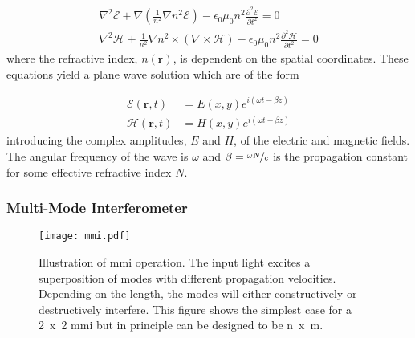 \begin{align}
	\nabla^2\mathcal{E} + \nabla\left(\frac{1}{n^2}\nabla n^2\mathcal{E}\right) - \epsilon_0\mu_0 n^2 \frac{\partial^2\mathcal{E}}{\partial t^2} = 0\\
	\nabla^2\mathcal{H} + \frac{1}{n^2}\nabla n^2\times\left(\nabla\times\mathcal{H}\right) - \epsilon_0\mu_0 n^2 \frac{\partial^2\mathcal{H}}{\partial t^2} = 0
\end{align}
where the refractive index, $n(\mathbf{r})$, is dependent on the spatial coordinates. These equations yield a plane wave solution which are of the form

\begin{align}
	\mathcal{E}(\mathbf{r}, t) &= E(x,y)e^{i(\omega t - \beta z)}\\
	\mathcal{H}(\mathbf{r}, t) &= H(x,y)e^{i(\omega t - \beta z)}
\end{align}
introducing the complex amplitudes, $E$ and $H$, of the electric and magnetic fields. The angular frequency  of the wave is $\omega$ and $\beta = \nicefrac{\omega N}{c}$ is the propagation constant for some effective refractive index $N$.






%
%
%
%
%
%

\subsubsection*{Multi-Mode Interferometer}

\begin{figure}[t]
	\centering
	\texttt{[image: mmi.pdf]}
	\caption[Multi-mode interferometer operating principle]{Illustration of \acs{mmi} operation. The input light excites a superposition of modes with different propagation velocities. Depending on the length, the modes will either constructively or destructively interfere. This figure shows the simplest case for a \si{2 x 2} \acs{mmi} but in principle can be designed to be \si{n x m}.}
	\label{fig:mmi}
\end{figure}

